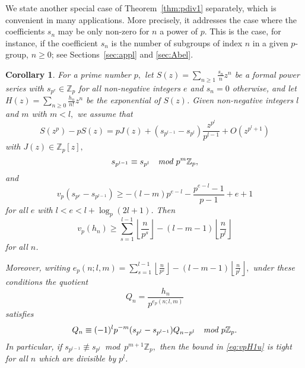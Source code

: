 \documentclass[12pt,reqno]{amsart}
\numberwithin{equation}{section}
\newtheorem{corollary}[theorem]{Corollary}
\theoremstyle{remark}
\begin{document}
We state another special case of Theorem~\ref{thm:pdiv1} separately,
which is convenient in many applications. More precisely, it addresses
the case where the coefficients $s_n$ may be only non-zero for $n$ a
power of $p$. This is the case, for instance, if the
coefficient $s_n$ is the number of subgroups of index $n$ in a
given $p$-group, $n\ge0$; see Sections~\ref{sec:appl} and \ref{sec:Abel}.

\begin{corollary} \label{thm:pdiv1u}
For a prime number $p,$
let\/ $S(z)=\sum_{n\ge1}\frac {s_n} {n}z^n$ be a formal power series
with $s_{p^e}\in{\mathbb{Z}}_p$ for all non-negative integers $e$ 
and $s_n=0$ otherwise, and let 
$H(z)=\sum_{n\ge0}\frac {h_n} {n!}z^n$ be the exponential of $S(z)$.
Given non-negative integers $l$ and $m$ with $m<l,$ we assume that
\begin{equation} \label{eq:pS1u}
S(z^{p})-pS(z)=pJ(z)+(s_{p^{l-1}}-s_{p^l})\frac {z^{p^l}} {p^{l-1}}
+O\left(z^{p^{l}+1}\right) 
\end{equation}
with $J(z)\in {\mathbb{Z}}_p[z],$ 
\begin{equation} \label{eq:p^mu} 
s_{p^{l-1}}\equiv s_{p^{l}}\quad 
\text{\em mod~$p^{m}{\mathbb{Z}}_p$},
\end{equation}
and
\begin{equation} \label{eq:sdiffu} 
v_p(s_{p^e}-s_{p^{l-1}})\ge -(l-m)p^{e-l}-\frac {p^{e-l}-1} {p-1}+e+1
\end{equation}
for all $e$ with $l<e<l+\log_p(2l+1)$.
Then
\begin{equation} \label{eq:vpH1u}
v_p(h_n)\ge \sum_{s=1}^{l-1} {\left\lfloor{\frac{n}{p^s}}\right\rfloor}
-(l-m-1){\left\lfloor{\frac {n} {p^l}}\right\rfloor}
\end{equation}
for all $n$.

Moreover, writing 
$e_p(n;l,m)=\sum_{s=1}^{l-1}{\left\lfloor{\frac {n} {p^{s}}}\right\rfloor}
-(l-m-1){\left\lfloor{\frac {n} {p^l}}\right\rfloor},$ 
under these conditions the quotient
\begin{equation*} 
Q_n=\frac {h_n} 
{p^{e_p(n;l,m)}}
\end{equation*}
satisfies
\begin{equation} \label{eq:Qrek1u} 
Q_n\equiv (-1)^lp^{-m}(s_{p^l}-s_{p^{l-1}})Q_{n-p^l} 
\quad \text{\em mod $p{\mathbb{Z}}_p$}.
\end{equation}
In particular, if 
\hbox{$s_{p^{l-1}}\not\equiv s_{p^{l}}$~{\em mod~$p^{m+1}{\mathbb{Z}}_p,$}}
then the bound in \eqref{eq:vpH1u} is tight for all $n$ which are
divisible by $p^l$.
\end{corollary}
\end{document}

